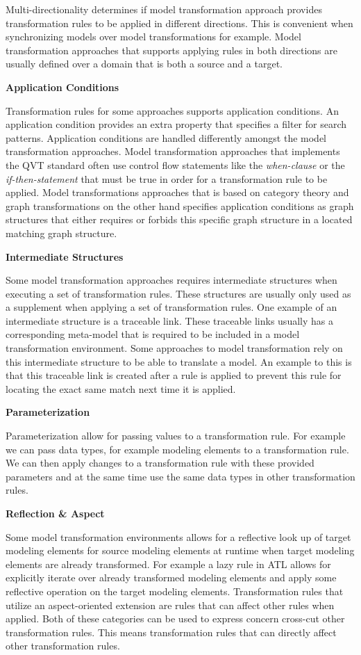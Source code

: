 Multi-directionality determines if model transformation approach provides
transformation rules to be applied in different directions. This is convenient
when synchronizing models over model transformations for example. Model
transformation approaches that supports applying rules in both directions are
usually defined over a domain that is both a source and a target.


\textbf{Application Conditions}

Transformation rules for some approaches supports application conditions. An
application condition provides an extra property that specifies a filter for
search patterns. Application conditions are handled differently amongst the
model transformation approaches. Model transformation approaches that implements
the QVT standard often use control flow statements like the \textit{when-clause}
or the \textit{if-then-statement} that must be true in order for a
transformation rule to be applied. Model transformations approaches that is
based on category theory and graph transformations on the other hand specifies
application conditions as graph structures that either requires or forbids this
specific graph structure in a located matching graph structure. 

\textbf{Intermediate Structures}

Some model transformation approaches requires intermediate structures when
executing a set of transformation rules. These structures are usually only
used as a supplement when applying a set of transformation rules. One
example of an intermediate structure is a traceable link. These traceable links
usually has a corresponding meta-model that is required to be included in a
model transformation environment. Some approaches to model transformation rely
on this intermediate structure to be able to translate a model. An example to
this is that this traceable link is created after a rule is applied to prevent
this rule for locating the exact same match next time it is applied. 

\textbf{Parameterization}

Parameterization allow for passing values to a transformation rule. For example
we can pass data types, for example modeling elements to a transformation rule.
We can then apply changes to a transformation rule with these provided
parameters and at the same time use the same data types in other
transformation rules.

\textbf{Reflection \& Aspect}

Some model transformation environments allows for a reflective look up of target
modeling elements for source modeling elements at runtime when target modeling
elements are already transformed. For example a lazy rule in ATL allows for
explicitly iterate over already transformed modeling elements and apply some
reflective operation on the target modeling elements. Transformation rules that
utilize an aspect-oriented extension are rules that can affect other rules when
applied. Both of these categories can be used to express concern cross-cut other
transformation rules. This means transformation rules that can directly affect
other transformation rules. 


